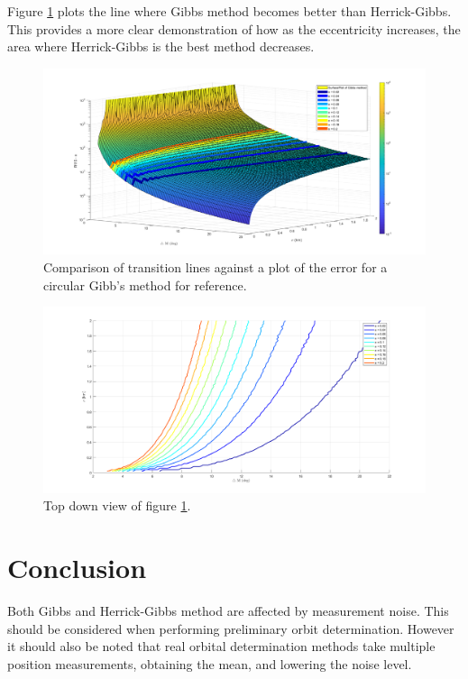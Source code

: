 \documentclass[12pt]{article}
\begin{document}
Figure \ref{fig:eccecomp} plots the line where Gibbs method becomes better than Herrick-Gibbs. This provides a more clear demonstration of how as the eccentricity increases, the area where Herrick-Gibbs is the best method decreases. 
\begin{figure}[H]
	\centering
	\includegraphics[width=0.7\linewidth]{ecceComp_3}
	\caption{Comparison of transition lines against a plot of the error for a circular Gibb's method for reference.}
	\label{fig:eccecomp}
\end{figure}

\begin{figure}[H]
	\centering
	\includegraphics[width=0.7\linewidth]{topDownEcce_Comp_3}
	\caption{Top down view of figure \ref{fig:eccecomp}.}
	\label{fig:topdowneccecomp3}
\end{figure}





	
	\section{Conclusion}
	Both Gibbs and Herrick-Gibbs method are affected by measurement noise. This should be considered when performing preliminary orbit determination. However it should also be noted that real orbital determination methods take multiple position measurements, obtaining the mean, and lowering the noise level. \par 
	
\end{document}
